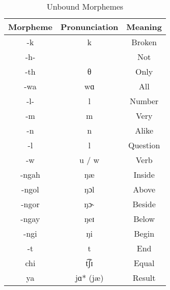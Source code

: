 \documentclass{article}
\begin{document}
\begin{table}[H]
\centering
\begin{tabular}{c|c|c}
 Morpheme & Pronunciation & Meaning \\
 \hline
-k & k & Broken \\
-h- & & Not \\
-th & θ & Only \\
-wa & wɑ & All \\
-l- & l & Number \\
-m & m & Very \\
-n & n & Alike \\
-l & l & Question \\
-w & u / w & Verb \\
-ngah &  ŋæ & Inside \\
-ngol & ŋɔl & Above \\
-ngor & ŋɔ˞& Beside \\
-ngay & ŋeɪ & Below \\
-ngi & ŋi & Begin \\
-t & t & End \\
chi & t͡ʃɪ & Equal \\
ya & jɑ* (jæ) & Result
\end{tabular}
\caption{Unbound Morphemes}
\label{Unbound Morphemes}
\end{table}
\end{document}
